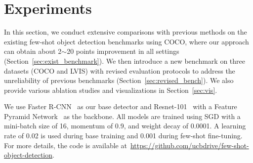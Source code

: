 \section{Experiments}

In this section, we conduct extensive comparisons with previous methods on the existing 
few-shot object detection benchmarks using COCO, where our approach can obtain
about 2$\sim$20 points improvement in all settings (Section~\ref{sec:exist_benchmark}). We then introduce a new benchmark on three datasets (COCO and LVIS) with revised evaluation protocols to address the unreliability of previous benchmarks (Section~\ref{sec:revised_bench}). We also provide various ablation studies and visualizations in Section~\ref{sec:vis}. 

We use Faster R-CNN~\cite{ren2015faster} as our base detector and Resnet-101~\cite{he2016deep} with a Feature Pyramid Network~\cite{lin2016feature} as the backbone.
All models are trained using SGD with a mini-batch size of 16, momentum of 0.9, and weight decay of 0.0001.
A learning rate of 0.02 is used during base training and 0.001 during few-shot fine-tuning.
For more details, the code is available at~\url{https://github.com/ucbdrive/few-shot-object-detection}.

